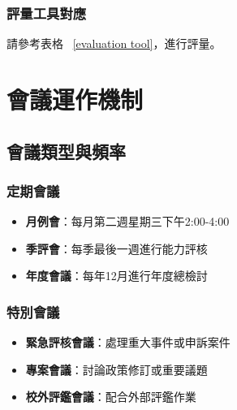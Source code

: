 \documentclass[12pt,a4paper]{article}
\begin{document}
\subsubsection{評量工具對應}
請參考表格 ~\ref{evaluation tool}，進行評量。



\section{會議運作機制}
\subsection{會議類型與頻率}
\subsubsection{定期會議}
\begin{itemize}[nosep]
    \item \textbf{月例會}：每月第二週星期三下午2:00-4:00
    \item \textbf{季評會}：每季最後一週進行能力評核
    \item \textbf{年度會議}：每年12月進行年度總檢討
\end{itemize}
\subsubsection{特別會議}
\begin{itemize}[nosep]
    \item \textbf{緊急評核會議}：處理重大事件或申訴案件
    \item \textbf{專案會議}：討論政策修訂或重要議題
    \item \textbf{校外評鑑會議}：配合外部評鑑作業
\end{itemize}
\end{document}

